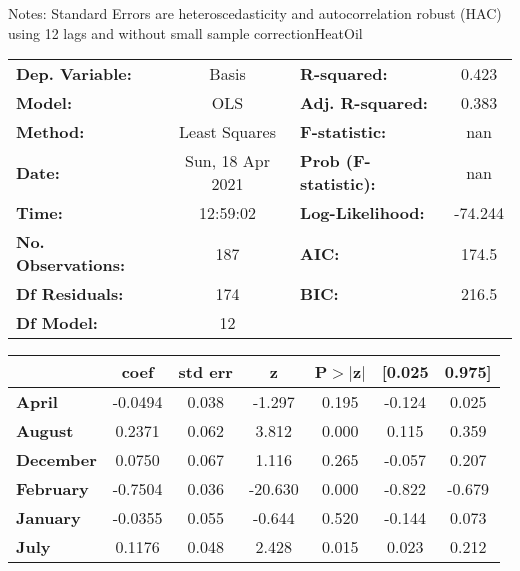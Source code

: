 Notes: \newline
 [1] Standard Errors are heteroscedasticity and autocorrelation robust (HAC) using 12 lags and without small sample correctionHeatOil\begin{center}
\begin{tabular}{lclc}
\toprule
\textbf{Dep. Variable:}    &      Basis       & \textbf{  R-squared:         } &     0.423   \\
\textbf{Model:}            &       OLS        & \textbf{  Adj. R-squared:    } &     0.383   \\
\textbf{Method:}           &  Least Squares   & \textbf{  F-statistic:       } &       nan   \\
\textbf{Date:}             & Sun, 18 Apr 2021 & \textbf{  Prob (F-statistic):} &      nan    \\
\textbf{Time:}             &     12:59:02     & \textbf{  Log-Likelihood:    } &   -74.244   \\
\textbf{No. Observations:} &         187      & \textbf{  AIC:               } &     174.5   \\
\textbf{Df Residuals:}     &         174      & \textbf{  BIC:               } &     216.5   \\
\textbf{Df Model:}         &          12      & \textbf{                     } &             \\
\bottomrule
\end{tabular}
\begin{tabular}{lcccccc}
                   & \textbf{coef} & \textbf{std err} & \textbf{z} & \textbf{P$> |$z$|$} & \textbf{[0.025} & \textbf{0.975]}  \\
\midrule
\textbf{April}     &      -0.0494  &        0.038     &    -1.297  &         0.195        &       -0.124    &        0.025     \\
\textbf{August}    &       0.2371  &        0.062     &     3.812  &         0.000        &        0.115    &        0.359     \\
\textbf{December}  &       0.0750  &        0.067     &     1.116  &         0.265        &       -0.057    &        0.207     \\
\textbf{February}  &      -0.7504  &        0.036     &   -20.630  &         0.000        &       -0.822    &       -0.679     \\
\textbf{January}   &      -0.0355  &        0.055     &    -0.644  &         0.520        &       -0.144    &        0.073     \\
\textbf{July}      &       0.1176  &        0.048     &     2.428  &         0.015        &        0.023    &        0.212     \\

\end{tabular}
\end{center}
